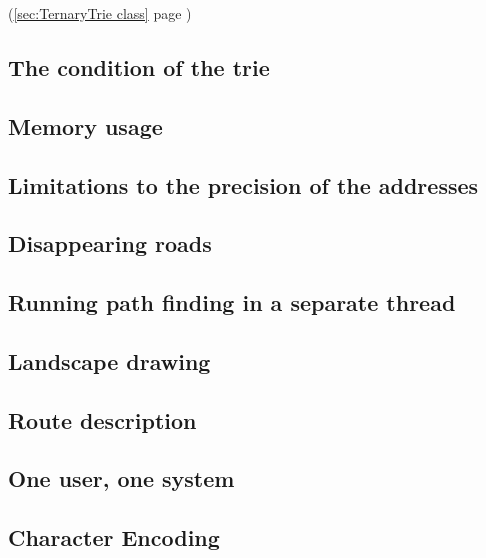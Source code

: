 \documentclass[a4paper,11pt]{article}
\begin{document}
(\ref{sec:TernaryTrie class} page \pageref{sec:TernaryTrie class})\subsection{The condition of the trie}


\subsection{Memory usage}


\subsection{Limitations to the precision of the addresses}


\subsection{Disappearing roads}


\subsection{Running path finding in a separate thread}


\subsection{Landscape drawing}


\subsection{Route description}


\subsection{One user, one system}
\label{sec:One user one system}


\subsection{Character Encoding}

\end{document}
